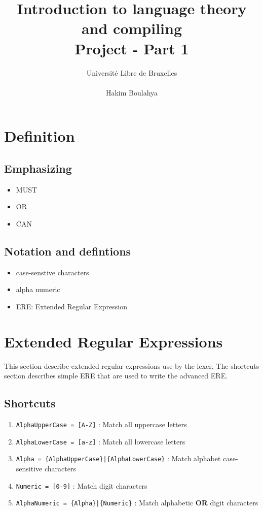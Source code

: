 \documentclass[letterpaper]{article}
\title{Introduction to language theory and compiling
\\ Project - Part 1}
\author{Université Libre de Bruxelles \\
\\ Hakim Boulahya}
\begin{document}
\maketitle

\section{Definition}

\subsection{Emphasizing}

\begin{itemize}
    \item MUST
    \item OR
    \item CAN
\end{itemize}

\subsection{Notation and defintions}

\begin{itemize}
    \item case-senstive characters
    \item alpha numeric
    \item ERE: Extended Regular Expression
\end{itemize}

\section{Extended Regular Expressions}
This section describe extended regular expressions use by the lexer.
The shortcuts section describes simple ERE that are used to write
the advanced ERE.
\subsection{Shortcuts}

\begin{enumerate}
    \item \texttt{AlphaUpperCase = [A-Z]} : Match all uppercase letters
    \item \texttt{AlphaLowerCase = [a-z]} : Match all lowercase letters
    \item \texttt{Alpha = \{AlphaUpperCase\}|\{AlphaLowerCase\}} :
    Match alphabet case-sensitive characters
    \item \texttt{Numeric = [0-9]} : Match digit characters
    \item \texttt{AlphaNumeric = \{Alpha\}|\{Numeric\}} :
    Match alphabetic \textbf{OR} digit characters
\end{enumerate}
\end{document}
